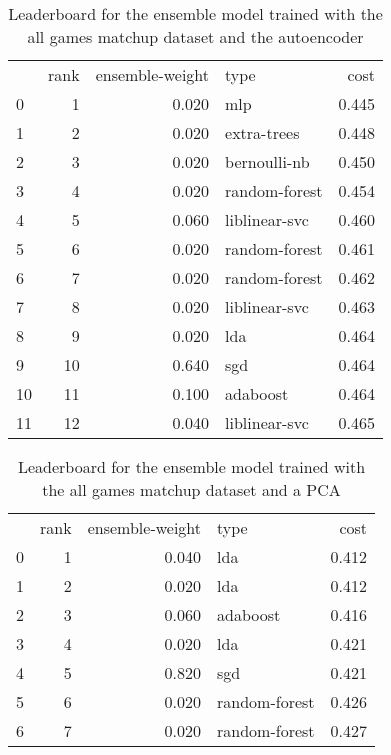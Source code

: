\begin{table}[]
	\centering
	\begin{tabular}{lrrlr}
		   & rank & ensemble-weight & type          & cost  \\
		0  & 1    & 0.020           & mlp           & 0.445 \\
		1  & 2    & 0.020           & extra-trees   & 0.448 \\
		2  & 3    & 0.020           & bernoulli-nb  & 0.450 \\
		3  & 4    & 0.020           & random-forest & 0.454 \\
		4  & 5    & 0.060           & liblinear-svc & 0.460 \\
		5  & 6    & 0.020           & random-forest & 0.461 \\
		6  & 7    & 0.020           & random-forest & 0.462 \\
		7  & 8    & 0.020           & liblinear-svc & 0.463 \\
		8  & 9    & 0.020           & lda           & 0.464 \\
		9  & 10   & 0.640           & sgd           & 0.464 \\
		10 & 11   & 0.100           & adaboost      & 0.464 \\
		11 & 12   & 0.040           & liblinear-svc & 0.465 \\
	\end{tabular}

	\caption{Leaderboard for the ensemble model trained with the all games matchup dataset and the autoencoder}
	\label{tab:lb-all-games-matchups-autoencode}
\end{table}

\begin{table}[]
	\centering
	\begin{tabular}{lrrlr}
		  & rank & ensemble-weight & type          & cost  \\
		0 & 1    & 0.040           & lda           & 0.412 \\
		1 & 2    & 0.020           & lda           & 0.412 \\
		2 & 3    & 0.060           & adaboost      & 0.416 \\
		3 & 4    & 0.020           & lda           & 0.421 \\
		4 & 5    & 0.820           & sgd           & 0.421 \\
		5 & 6    & 0.020           & random-forest & 0.426 \\
		6 & 7    & 0.020           & random-forest & 0.427 \\
	\end{tabular}

	\caption{Leaderboard for the ensemble model trained with the all games matchup dataset and a PCA}
	\label{tab:lb-all-games-matchups-PCA}
\end{table}

